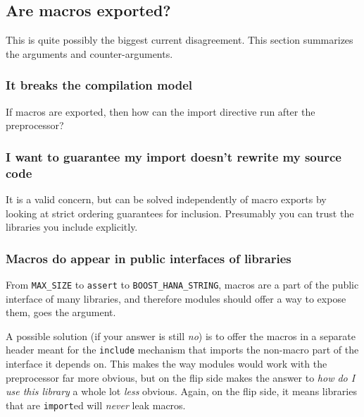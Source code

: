 \documentclass[reqno]{article}
\begin{document}
\subsection{Are macros exported?}

This is quite possibly the biggest current disagreement. This section summarizes
the arguments and counter-arguments.


\subsubsection{It breaks the compilation model}

If macros are exported, then how can the import directive run after the
preprocessor?

\subsubsection{I want to guarantee my import doesn't rewrite my source code}

It is a valid concern, but can be solved independently of macro exports by
looking at strict ordering guarantees for inclusion. Presumably you can trust
the libraries you include explicitly.

\subsubsection{Macros do appear in public interfaces of libraries}

From \texttt{MAX\_SIZE} to \texttt{assert} to \texttt{BOOST\_HANA\_STRING},
macros are a part of the public interface of many libraries, and therefore
modules should offer a way to expose them, goes the argument.

A possible solution (if your answer is still \emph{no}) is to offer the macros
in a separate header meant for the \texttt{include} mechanism that imports the
non-macro part of the interface it depends on. This makes the way modules would
work with the preprocessor far more obvious, but on the flip side makes the
answer to \emph{how do I use this library} a whole lot \emph{less} obvious.
Again, on the flip side, it means libraries that are \texttt{import}ed will
\emph{never} leak macros.



% 
\end{document}
